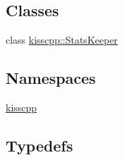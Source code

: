 \subsection*{Classes}
\begin{DoxyCompactItemize}
\item 
class \hyperlink{a00042}{kisscpp\-::\-Stats\-Keeper}
\end{DoxyCompactItemize}
\subsection*{Namespaces}
\begin{DoxyCompactItemize}
\item 
\hyperlink{a00089}{kisscpp}
\end{DoxyCompactItemize}
\subsection*{Typedefs}
